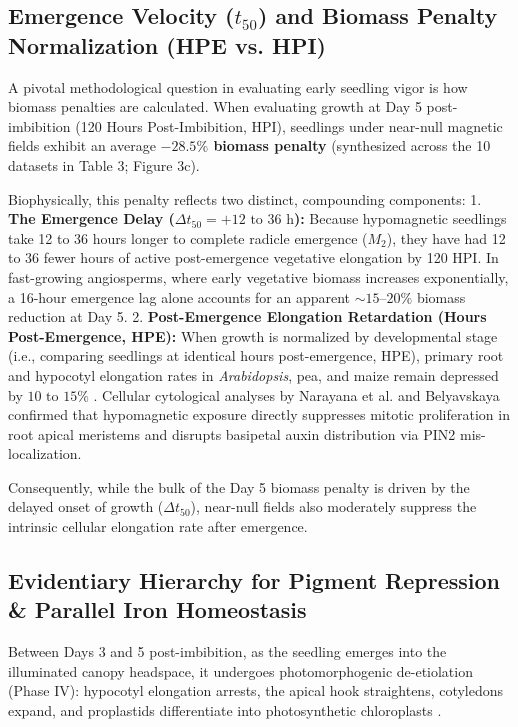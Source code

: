 \documentclass[default,sn-nature,iicol]{sn-jnl}
\begin{document}




\subsection{Emergence Velocity ($t_{50}$) and Biomass Penalty Normalization (HPE vs. HPI)}
A pivotal methodological question in evaluating early seedling vigor is how biomass penalties are calculated. When evaluating growth at Day 5 post-imbibition (120 Hours Post-Imbibition, HPI), seedlings under near-null magnetic fields exhibit an average \textbf{$-28.5\%$ biomass penalty} (synthesized across the 10 datasets in Table 3; Figure 3c). 

Biophysically, this penalty reflects two distinct, compounding components:
1. \textbf{The Emergence Delay ($\Delta t_{50} = +12\text{ to }36\text{ h}$):} Because hypomagnetic seedlings take 12 to 36 hours longer to complete radicle emergence ($M_2$), they have had 12 to 36 fewer hours of active post-emergence vegetative elongation by 120 HPI. In fast-growing angiosperms, where early vegetative biomass increases exponentially, a 16-hour emergence lag alone accounts for an apparent $\sim 15\text{--}20\%$ biomass reduction at Day 5.
2. \textbf{Post-Emergence Elongation Retardation (Hours Post-Emergence, HPE):} When growth is normalized by developmental stage (i.e., comparing seedlings at identical hours post-emergence, HPE), primary root and hypocotyl elongation rates in \textit{Arabidopsis}, pea, and maize remain depressed by $10\text{ to }15\%$ \cite{ref26,ref37,ref39}. Cellular cytological analyses by Narayana et al. \cite{ref37} and Belyavskaya \cite{ref38} confirmed that hypomagnetic exposure directly suppresses mitotic proliferation in root apical meristems and disrupts basipetal auxin distribution via PIN2 mis-localization.

Consequently, while the bulk of the Day 5 biomass penalty is driven by the delayed onset of growth ($\Delta t_{50}$), near-null fields also moderately suppress the intrinsic cellular elongation rate after emergence.


\subsection{Evidentiary Hierarchy for Pigment Repression \& Parallel Iron Homeostasis}
Between Days 3 and 5 post-imbibition, as the seedling emerges into the illuminated canopy headspace, it undergoes photomorphogenic de-etiolation (Phase IV): hypocotyl elongation arrests, the apical hook straightens, cotyledons expand, and proplastids differentiate into photosynthetic chloroplasts \cite{ref23,ref24}. 
\end{document}
